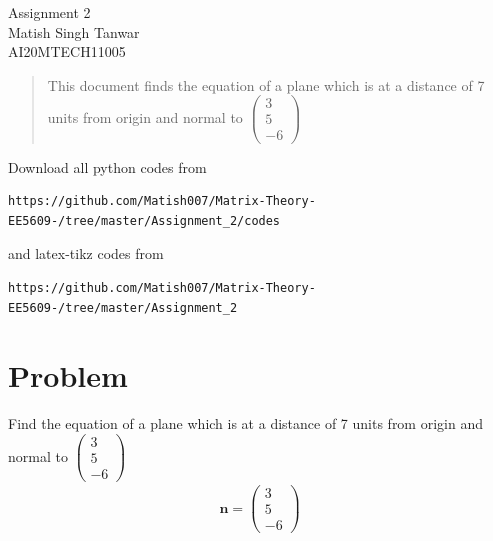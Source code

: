 \documentclass[journal,12pt,twocolumn]{IEEEtran}
\begin{document}
\begin{center}
\huge Assignment 2\\

\large Matish Singh Tanwar\\
\large AI20MTECH11005\\
\end{center}
\vspace{1.0cm}
\begin{abstract}
This document finds the equation of a plane which is at a distance of 7 units from origin and normal to $\begin{pmatrix}3\\5\\-6\end{pmatrix}$
\end{abstract}
\vspace{0.5cm}
Download all python codes from 
\begin{lstlisting}
https://github.com/Matish007/Matrix-Theory-EE5609-/tree/master/Assignment_2/codes
\end{lstlisting}
%
and latex-tikz codes from 
\begin{lstlisting}
https://github.com/Matish007/Matrix-Theory-EE5609-/tree/master/Assignment_2
\end{lstlisting}
%
\vspace{0.5mm}
\section{Problem}
Find the equation of a plane which is at a distance of 7 units from origin and normal to $\begin{pmatrix}3\\5\\-6\end{pmatrix}$\\
\begin{align}
    \mathbf{n}=\begin{pmatrix}3\\5\\-6\end{pmatrix}
\end{align}
\end{document}
